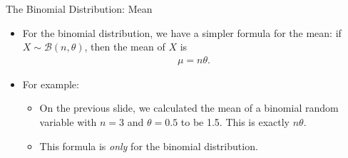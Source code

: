 \documentclass[10pt, handout, xcolor=table]{beamer}
\begin{document}
\begin{frame}{The Binomial Distribution: Mean}
\begin{itemize}
\setlength{\itemsep}{20pt}
\item For the binomial distribution, we have a simpler formula for the mean: if $X\sim \mathcal{B}(n, \theta)$, then the mean of $X$ is
\begin{align*}
\mu = n\theta.
\end{align*}
\item<2-> For example: 
\begin{itemize}
\item \color{blue!70} On the previous slide, we calculated the mean of a binomial random variable with $n = 3$ and $\theta = 0.5$ to be 1.5. This is exactly $n\theta$. 
\end{itemize}
\vspace{0.5cm}
\begin{itemize}
\item<3->[Note:] This formula is \emph{only} for the binomial distribution.
\end{itemize}
\end{itemize}
\end{frame}
\end{document}
